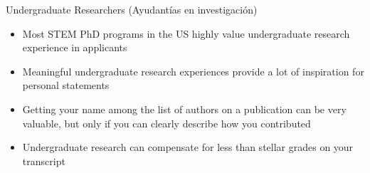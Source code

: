\begin{frame}[fragile]{Undergraduate Researchers \textcolor{yellow!80!black}{(Ayudant\'ias en investigaci\'on)}}
    \begin{itemize}
        \item Most STEM PhD programs in the US highly value undergraduate research experience in applicants
        \item Meaningful undergraduate research experiences provide a lot of inspiration for personal statements
        \item Getting your name among the list of authors on a publication can be very valuable, but only if you can clearly describe how you contributed
        \item Undergraduate research can compensate for less than stellar grades on your transcript
    \end{itemize}
\end{frame}

